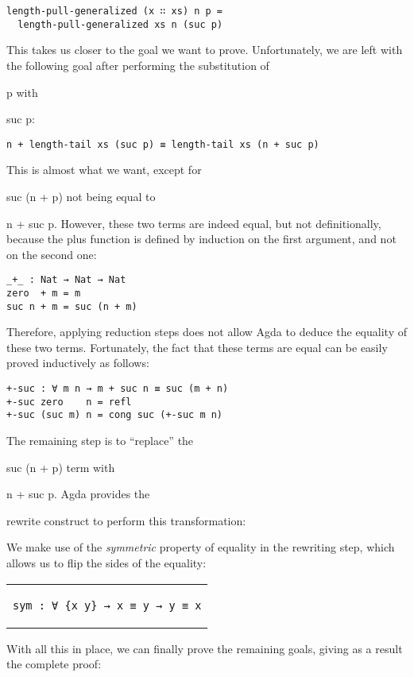 \documentclass{cys}
\newcommand*{\SavedLstInline}{}
\DeclareRobustCommand*{\lstinline}{%
  \ifmmode
    \let\SavedBGroup\bgroup
    \def\bgroup{%
      \let\bgroup\SavedBGroup
      \hbox\bgroup
    }%
  \fi
  \SavedLstInline
  }
\begin{document}
\begin{lstlisting}
length-pull-generalized (x ∷ xs) n p =
  length-pull-generalized xs n (suc p)
\end{lstlisting}

This takes us closer to the goal we want to prove. Unfortunately, we are left with the
following goal after performing the substitution of \lstinline{p} with \lstinline{suc p}:

\begin{lstlisting}
n + length-tail xs (suc p) ≡ length-tail xs (n + suc p)
\end{lstlisting}

This is almost what we want, except for \lstinline{suc (n + p)} not being
equal to \lstinline{n + suc p}. However, these two terms are indeed equal, but not
definitionally, because the plus function is defined by induction on the first argument,
and not on the second one:

\begin{lstlisting}
_+_ : Nat → Nat → Nat
zero  + m = m
suc n + m = suc (n + m)
\end{lstlisting}

Therefore, applying reduction steps does not allow Agda to deduce the equality of these
two terms. Fortunately, the fact that these terms are equal can be easily proved
inductively as follows:

\begin{lstlisting}
+-suc : ∀ m n → m + suc n ≡ suc (m + n)
+-suc zero    n = refl
+-suc (suc m) n = cong suc (+-suc m n)
\end{lstlisting}

The remaining step is to ``replace'' the \lstinline{suc (n + p)} term with
\lstinline{n + suc p}. Agda provides the \lstinline{rewrite} construct to perform this
transformation:



We make use of the \emph{symmetric} property of equality in the rewriting step, which
allows us to flip the sides of the equality:

\begin{center}
\begin{tabular}{c}
\begin{lstlisting}
sym : ∀ {x y} → x ≡ y → y ≡ x
\end{lstlisting}
\end{tabular}
\end{center}

With all this in place, we can finally prove the remaining goals, giving as a result the
complete proof:
\end{document}
